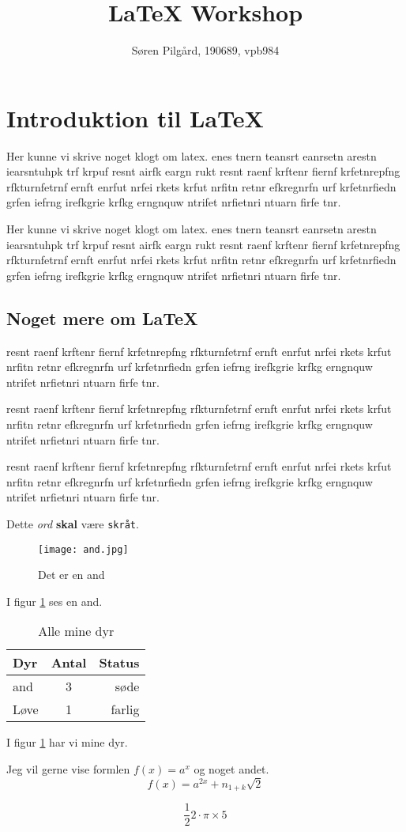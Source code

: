 \documentclass[10pt,a4paper,danish]{article}
\title{\LaTeX{} Workshop}
\author{Søren Pilgård, 190689, vpb984}
\begin{document}
\maketitle
\newpage

\section*{Introduktion til \LaTeX}

Her kunne vi skrive noget klogt om latex.
enes tnern teansrt eanrsetn arestn iearsntuhpk trf krpuf resnt airfk eargn rukt
resnt raenf krftenr fiernf krfetnrepfng rfkturnfetrnf ernft enrfut nrfei rkets
krfut nrfitn retnr efkregnrfn urf krfetnrfiedn grfen iefrng irefkgrie krfkg
erngnquw ntrifet nrfietnri ntuarn firfe tnr.

Her kunne vi skrive noget klogt om latex.
enes tnern teansrt eanrsetn arestn iearsntuhpk trf krpuf resnt airfk eargn rukt
resnt raenf krftenr fiernf krfetnrepfng rfkturnfetrnf ernft enrfut nrfei rkets
krfut nrfitn retnr efkregnrfn urf krfetnrfiedn grfen iefrng irefkgrie krfkg
erngnquw ntrifet nrfietnri ntuarn firfe tnr.

\subsection{Noget mere om \LaTeX}
resnt raenf krftenr fiernf krfetnrepfng rfkturnfetrnf ernft enrfut nrfei rkets
krfut nrfitn retnr efkregnrfn urf krfetnrfiedn grfen iefrng irefkgrie krfkg
erngnquw ntrifet nrfietnri ntuarn firfe tnr.

resnt raenf krftenr fiernf krfetnrepfng rfkturnfetrnf ernft enrfut nrfei rkets
krfut nrfitn retnr efkregnrfn urf krfetnrfiedn grfen iefrng irefkgrie krfkg
erngnquw ntrifet nrfietnri ntuarn firfe tnr.

resnt raenf krftenr fiernf krfetnrepfng rfkturnfetrnf ernft enrfut nrfei rkets
krfut nrfitn retnr efkregnrfn urf krfetnrfiedn grfen iefrng irefkgrie krfkg
erngnquw ntrifet nrfietnri ntuarn firfe tnr.

Dette \textit{ord} \textbf{skal} være \texttt{skråt}.

\begin{figure}[h]
  \centering
  \texttt{[image: and.jpg]}
  \caption{Det er en and}
  \label{fig:and}
\end{figure}

I figur \ref{fig:and} ses en and.

\begin{table}[h]
  \centering
  \begin{tabular}[h]{l|c|r}
    Dyr & Antal & Status \\
    \hline
    \hline
    and & 3 & søde \\
    \hline
    Løve & 1 & farlig \\
  \end{tabular}
  \caption{Alle mine dyr}
  \label{tbl:mine-dyr}
\end{table}

I figur \ref{tbl:mine-dyr} har vi mine dyr.



Jeg vil gerne vise formlen \(f(x) = a^{x}\) og noget andet.
\[f(x) = a^{2x} + n_{1 + k} \sqrt{2} \]

\[\frac{1}{2} 2 \cdot \pi \times 5\]
\end{document}
